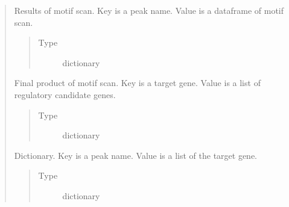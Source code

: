 \documentclass[letterpaper,10pt,english]{sphinxmanual}
\begin{document}
\begin{quote}
\begin{fulllineitems}

\begin{fulllineitems}
\label{\detokenize{modules/celloracle.motif_analysis:celloracle.motif_analysis.TFinfo.scanned_df}}
Results of motif scan. Key is a peak name. Value is a dataframe of motif scan.
\begin{quote}\begin{description}
\item[{Type}] \leavevmode
dictionary

\end{description}\end{quote}

\end{fulllineitems}


\begin{fulllineitems}
\label{\detokenize{modules/celloracle.motif_analysis:celloracle.motif_analysis.TFinfo.dic_targetgene2TFs}}
Final product of motif scan. Key is a target gene. Value is a list of regulatory candidate genes.
\begin{quote}\begin{description}
\item[{Type}] \leavevmode
dictionary

\end{description}\end{quote}

\end{fulllineitems}


\begin{fulllineitems}
\label{\detokenize{modules/celloracle.motif_analysis:celloracle.motif_analysis.TFinfo.dic_peak2Targetgene}}
Dictionary. Key is a peak name. Value is a list of the target gene.
\begin{quote}\begin{description}
\item[{Type}] \leavevmode
dictionary


\end{description}
\end{quote}
\end{fulllineitems}
\end{fulllineitems}
\end{quote}
\end{document}
